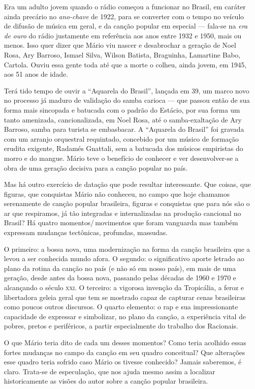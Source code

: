 Era um adulto jovem quando o rádio começou a funcionar no Brasil, em
caráter ainda precário no \textit{ano-chave} de 1922, para se converter com o
tempo no veículo de difusão de música em geral, e da canção popular em
especial --- fala-se na \textit{era de ouro} do rádio justamente em referência
aos anos entre 1932 e 1950, mais ou menos. Isso quer dizer que Mário viu
nascer e desabrochar a geração de Noel Rosa, Ary Barroso, Ismael Silva,
Wilson Batista, Braguinha, Lamartine Babo, Cartola. Ouviu essa gente
toda até que a morte o colheu, ainda jovem, em 1945, aos 51 anos de
idade.

Terá tido tempo de ouvir a ``Aquarela do Brasil'', lançada em 39, um
marco novo no processo já maduro de validação do samba carioca --- que
passou então de sua forma mais sincopada e batucada com o padrão do
Estácio, por sua forma um tanto amenizada, cancionalizada, em Noel Rosa,
até o samba-exaltação de Ary Barroso, samba para turista se embasbacar.
A ``Aquarela do Brasil'' foi gravada com um arranjo orquestral
requintado, concebido por um músico de formação erudita exigente,
Radamés Gnattali, sem a batucada dos músicos empiristas do morro e do
mangue. Mário teve o benefício de conhecer e ver desenvolver-se a obra
de uma geração decisiva para a canção popular no país.

Mas há outro exercício de datação que pode resultar interessante. Que
coisas, que figuras, que conquistas Mário não conheceu, no campo
que hoje chamamos serenamente de canção popular brasileira, figuras e
conquistas que para nós são o ar que respiramos, já tão integradas e
internalizadas na produção cancional no Brasil? Há quatro
momentos/\,movimentos que foram vanguarda mas também expressam mudanças
tectônicas, profundas, massudas.

O primeiro: a bossa nova, uma modernização na forma da canção brasileira
que a levou a ser conhecida mundo afora. O segundo: o significativo
aporte letrado ao plano da rotina da canção no país (e não só em nosso
país), em mais de uma geração, desde antes da bossa nova, passando pelas
décadas de 1960 e 1970 e alcançando o século \textsc{xxi}. O terceiro: a vigorosa
invenção da Tropicália, a feroz e libertadora geleia geral que tem se
mostrado capaz de capturar cenas brasileiras como poucos outros
discursos. O quarto elemento: o rap e sua impressionante capacidade de
expressar e simbolizar, no plano da canção, a experiência vital de
pobres, pretos e periféricos, a partir especialmente do trabalho dos
Racionais.

O que Mário teria dito de cada um desses momentos? Como teria acolhido
essas fortes mudanças no campo da canção em seu quadro conceitual? Que
alterações esse quadro teria sofrido caso Mário os tivesse conhecido?
Jamais saberemos, é claro. Trata-se de especulação, que nos ajuda mesmo
assim a localizar historicamente as visões do autor sobre a canção
popular brasileira.


